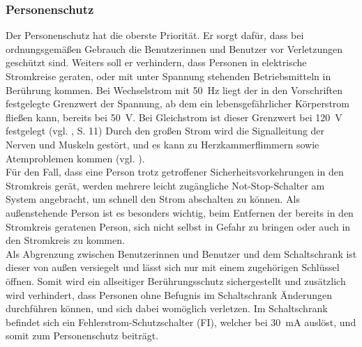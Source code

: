 \subsubsection{Personenschutz}\label{sc: Personenschutz}
Der Personenschutz hat die oberste Priorität. Er sorgt dafür, dass bei ordnungsgemäßen Gebrauch die Benutzerinnen und Benutzer vor Verletzungen geschützt sind. Weiters soll er verhindern, dass Personen in elektrische Stromkreise geraten, oder mit unter Spannung stehenden Betriebsmitteln in Berührung kommen. Bei Wechselstrom mit \qty{50}{\hertz} liegt der in den Vorschriften festgelegte Grenzwert der Spannung, ab dem ein lebensgefährlicher Körperstrom fließen kann, bereits bei \qty{50}{\volt}. Bei Gleichstrom ist dieser Grenzwert bei \qty{120}{\volt} festgelegt (vgl. \cite{SeyrRösch}, S. 11) Durch den großen Strom wird die Signalleitung der Nerven und Muskeln gestört, und es kann zu Herzkammerflimmern sowie Atemproblemen kommen (vgl. \cite{Gefahr_el_Strom}).\\
Für den Fall, dass eine Person trotz getroffener Sicherheitsvorkehrungen in den Stromkreis gerät, werden mehrere leicht zugängliche Not-Stop-Schalter am System angebracht, um schnell den Strom abschalten zu können. Als außenstehende Person ist es besonders wichtig, beim Entfernen der bereits in den Stromkreis geratenen Person, sich nicht selbst in Gefahr zu bringen oder auch in den Stromkreis zu kommen.\\
Als Abgrenzung zwischen Benutzerinnen und Benutzer und dem Schaltschrank ist dieser von außen versiegelt und lässt sich nur mit einem zugehörigen Schlüssel öffnen. Somit wird ein allseitiger Berührungsschutz sichergestellt und zusätzlich wird verhindert, dass Personen ohne Befugnis im Schaltschrank Änderungen durchführen können, und sich dabei womöglich verletzen. Im Schaltschrank befindet sich ein Fehlerstrom-Schutzschalter (FI), welcher bei \qty{30}{\milli\ampere} auslöst, und somit zum Personenschutz beiträgt.

